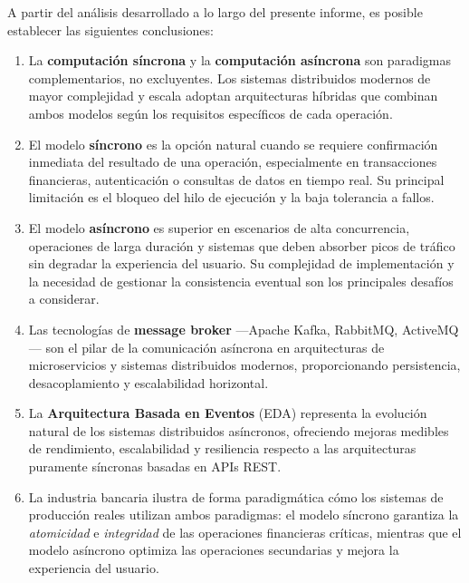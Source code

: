 \documentclass[12pt,a4paper]{article}
\begin{document}
A partir del análisis desarrollado a lo largo del presente informe, es posible establecer las siguientes conclusiones:
 
\begin{enumerate}
  \item La \textbf{computación síncrona} y la \textbf{computación asíncrona} son paradigmas complementarios, no excluyentes. Los sistemas distribuidos modernos de mayor complejidad y escala adoptan arquitecturas híbridas que combinan ambos modelos según los requisitos específicos de cada operación.
 
  \item El modelo \textbf{síncrono} es la opción natural cuando se requiere confirmación inmediata del resultado de una operación, especialmente en transacciones financieras, autenticación o consultas de datos en tiempo real. Su principal limitación es el bloqueo del hilo de ejecución y la baja tolerancia a fallos.
 
  \item El modelo \textbf{asíncrono} es superior en escenarios de alta concurrencia, operaciones de larga duración y sistemas que deben absorber picos de tráfico sin degradar la experiencia del usuario. Su complejidad de implementación y la necesidad de gestionar la consistencia eventual son los principales desafíos a considerar.
 
  \item Las tecnologías de \textbf{message broker} —Apache Kafka, RabbitMQ, ActiveMQ— son el pilar de la comunicación asíncrona en arquitecturas de microservicios y sistemas distribuidos modernos, proporcionando persistencia, desacoplamiento y escalabilidad horizontal.
 
  \item La \textbf{Arquitectura Basada en Eventos} (EDA) representa la evolución natural de los sistemas distribuidos asíncronos, ofreciendo mejoras medibles de rendimiento, escalabilidad y resiliencia respecto a las arquitecturas puramente síncronas basadas en APIs REST.
 
  \item La industria bancaria ilustra de forma paradigmática cómo los sistemas de producción reales utilizan ambos paradigmas: el modelo síncrono garantiza la \textit{atomicidad} e \textit{integridad} de las operaciones financieras críticas, mientras que el modelo asíncrono optimiza las operaciones secundarias y mejora la experiencia del usuario.
\end{enumerate}
 
\end{document}
